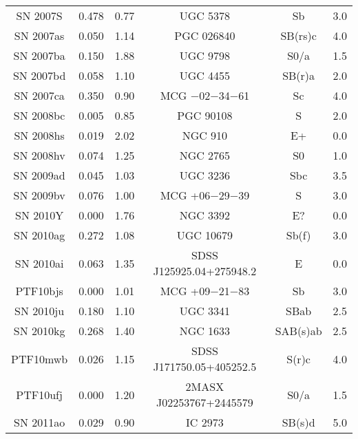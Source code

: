 \begin{tabular}{|c|c|c|c|c|c|}
SN 2007S  & 0.478 & 0.77 & UGC 5378                  & Sb         & 3.0 \\
SN 2007as & 0.050 & 1.14 & PGC 026840                & SB(rs)c    & 4.0 \\
SN 2007ba & 0.150 & 1.88 & UGC 9798                  & S0/a       & 1.5 \\
SN 2007bd & 0.058 & 1.10 & UGC 4455                  & SB(r)a     & 2.0 \\
SN 2007ca & 0.350 & 0.90 & MCG $-$02$-$34$-$61       & Sc         & 4.0 \\
SN 2008bc & 0.005 & 0.85 & PGC 90108                 & S          & 2.0 \\
SN 2008hs & 0.019 & 2.02 & NGC 910                   & E+         & 0.0 \\
SN 2008hv & 0.074 & 1.25 & NGC 2765                  & S0         & 1.0 \\
SN 2009ad & 0.045 & 1.03 & UGC 3236                  & Sbc        & 3.5 \\
SN 2009bv & 0.076 & 1.00 & MCG +06$-$29$-$39         & S          & 3.0 \\
SN 2010Y  & 0.000 & 1.76 & NGC 3392                  & E?         & 0.0 \\
SN 2010ag & 0.272 & 1.08 & UGC 10679                 & Sb(f)      & 3.0 \\
SN 2010ai & 0.063 & 1.35 & SDSS J125925.04+275948.2  & E          & 0.0 \\
PTF10bjs  & 0.000 & 1.01 & MCG +09$-$21$-$83         & Sb         & 3.0 \\
SN 2010ju & 0.180 & 1.10 & UGC 3341                  & SBab       & 2.5 \\
SN 2010kg & 0.268 & 1.40 & NGC 1633                  & SAB(s)ab   & 2.5 \\
PTF10mwb  & 0.026 & 1.15 & SDSS J171750.05+405252.5  & S(r)c      & 4.0 \\
PTF10ufj  & 0.000 & 1.20 & 2MASX J02253767+2445579   & S0/a       & 1.5 \\
SN 2011ao & 0.029 & 0.90 & IC 2973                   & SB(s)d     & 5.0 \\
\hline
\end{tabular}
